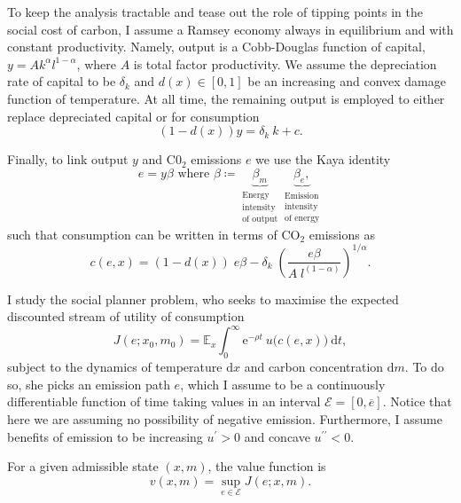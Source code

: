\documentclass[../../main.tex]{subfiles}
\begin{document}
To keep the analysis tractable and tease out the role of tipping points in the social cost of carbon, I assume a Ramsey economy always in equilibrium and with constant productivity. Namely, output is a Cobb-Douglas function of capital, $y = A k^\alpha l^{1 - \alpha}$, where $A$ is total factor productivity. We assume the depreciation rate of capital to be $\delta_k$ and  $d(x) \in [0, 1]$ be an increasing and convex damage function of temperature. At all time, the remaining output is employed to either replace depreciated capital or for consumption \begin{equation}
    (1 - d(x)) y = \delta_k \ k + c.
\end{equation}

Finally, to link output $y$ and C0$_2$ emissions $e$ we use the Kaya identity \begin{equation}
    e = y \beta  \text{ where } \beta \coloneqq \underbrace{\beta_m}_{\substack{\text{Energy} \\ \text{intensity} \\ \text{of output}}} \underbrace{\beta_e,}_{\substack{\text{Emission} \\ \text{intensity} \\ \text{of energy}}}
\end{equation} such that consumption can be written in terms of CO$_2$ emissions as \begin{equation}
    c(e, x) = (1 - d(x)) \; e \beta - \delta_k \; \left(\frac{e \beta}{A \; l^{(1 - \alpha)}}\right)^{1 / \alpha}. 
\end{equation}

I study the social planner problem, who seeks to maximise the expected discounted stream of utility of consumption \begin{equation}
    J(e; x_0, m_0) = \mathbb{E}_{x} \int^{\infty}_0 \mathrm{e}^{-\rho t} \ u\Big(c(e, x)\Big) \ \text{d} t,
\end{equation} subject to the dynamics of temperature $\text{d}x$ and carbon concentration $\text{d}m$. To do so, she picks an emission path $e$, which I assume to be a continuously differentiable function of time taking values in an interval $\mathcal{E} = [0, \overline{e}]$. Notice that here we are assuming no possibility of negative emission. Furthermore, I assume benefits of emission to be increasing $u^\prime > 0$ and concave $u^{\prime \prime} < 0$. 

For a given admissible state $(x, m)$, the value function is \begin{equation}
    v(x, m) = \sup_{e \in \mathcal{E}} J(e; x, m).
\end{equation} 
\end{document}
